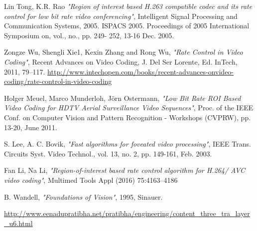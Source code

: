 \documentclass[11pt]{article} %
\begin{document}
\begin{thebibliography}{9}
Lin Tong, K.R. Rao \textit{"Region of interest based H.263 compatible codec and its rate control for low bit rate video conferencing"}, 
Intelligent Signal Processing and Communication Systems, 2005. ISPACS 2005. Proceedings of 2005 International Symposium on, vol., no., pp. 249- 252, 13-16 Dec. 2005.

Zongze Wu, Shengli Xie1, Kexin Zhang and Rong Wu, \textit{"Rate Control in Video Coding"},
Recent Advances on Video Coding, J. Del Ser Lorente, Ed. InTech,
2011, 79–117. \url{http://www.intechopen.com/books/recent-advances-onvideo-coding/rate-control-in-video-coding}

Holger Meuel, Marco Munderloh, Jörn Ostermann, \textit{"Low Bit Rate ROI Based Video Coding for HDTV Aerial Surveillance Video Sequences"}, 
Proc. of the IEEE Conf. on Computer Vision and Pattern Recognition - Workshops (CVPRW), pp. 13-20, June 2011.

S. Lee, A. C. Bovik, \textit{"Fast algorithms for foveated video processing"},
IEEE Trans. Circuits Syst. Video Technol., vol. 13, no. 2, pp. 149-161, Feb. 2003.

Fan Li, Na Li, \textit{"Region-of-interest based rate control algorithm for H.264/
AVC video coding"},
Multimed Tools Appl (2016) 75:4163–4186
 
B. Wandell, \textit{"Foundations of Vision"}, 1995, Sinauer.

\url{http://www.eenadupratibha.net/pratibha/engineering/content_three_tra_layer_u6.html}
\end{thebibliography}
\end{document}

